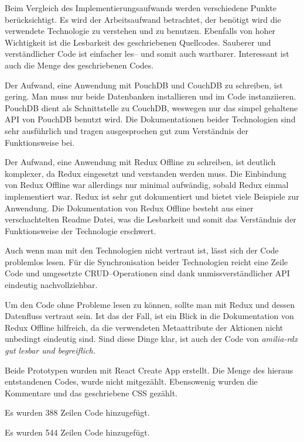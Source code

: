 Beim Vergleich des Implementierungsaufwands werden verschiedene Punkte berücksichtigt.
Es wird der Arbeitsaufwand betrachtet, der benötigt wird die verwendete Technologie zu verstehen und zu benutzen.
Ebenfalls von hoher Wichtigkeit ist die Lesbarkeit des geschriebenen Quellcodes.
Sauberer und verständlicher Code ist einfacher les-- und somit auch wartbarer. Interessant ist auch die Menge des geschriebenen Codes.
%
%
\begin{description}[leftmargin=0cm,style=nextline]
  \item[amilia-qouch]
  Der Aufwand, eine Anwendung mit PouchDB und CouchDB zu schreiben, ist gering.
  Man muss nur beide Datenbanken installieren und im Code instanziieren.
  PouchDB dient als Schnittstelle zu CouchDB, weswegen nur das simpel gehaltene \gls{API} von PouchDB benutzt wird.
  Die Dokumentationen beider Technologien sind sehr ausführlich und tragen ausgesprochen gut zum Verständnis der Funktionsweise bei.

  \item[amilia-rdx]
  Der Aufwand, eine Anwendung mit Redux Offline zu schreiben, ist deutlich komplexer, da Redux eingesetzt und verstanden werden muss.
  Die Einbindung von Redux Offline war allerdings nur minimal aufwändig, sobald Redux einmal implementiert war.
  Redux ist sehr gut dokumentiert und bietet viele Beispiele zur Anwendung.
  Die Dokumentation von Redux Offline besteht aus einer verschachtelten Readme Datei, was die Lesbarkeit und somit das Verständnis der Funktionsweise der Technologie erschwert.
\end{description}
%
%
\begin{description}[leftmargin=0cm,style=nextline]
  \item[amilia-qouch]
  Auch wenn man mit den Technologien nicht vertraut ist, lässt sich der Code problemlos lesen.
  Für die Synchronisation beider Technologien reicht eine Zeile Code und umgesetzte \gls{CRUD}--Operationen sind dank unmissverständlicher API eindeutig nachvollziehbar.
  \item[amilia-rdx]
  Um den Code ohne Probleme lesen zu können, sollte man mit Redux und dessen Datenfluss vertraut sein.
  Ist das der Fall, ist ein Blick in die Dokumentation von Redux Offline hilfreich, da die verwendeten Metaattribute der Aktionen nicht unbedingt eindeutig sind.
  Sind diese Dinge klar, ist auch der Code von \it{amilia-rdx} gut lesbar und begreiflich.
\end{description}
%
  Beide Prototypen wurden mit React Create App erstellt.
  Die Menge des hieraus entstandenen Codes, wurde nicht mitgezählt. Ebensowenig wurden die Kommentare und das geschriebene \gls{CSS} gezählt.
\begin{description}[leftmargin=0cm,style=nextline]
    \item[amilia-qouch]
    Es wurden 388 Zeilen Code hinzugefügt.
    \item[amilia-rdx]
    Es wurden 544 Zeilen Code hinzugefügt.
\end{description}
